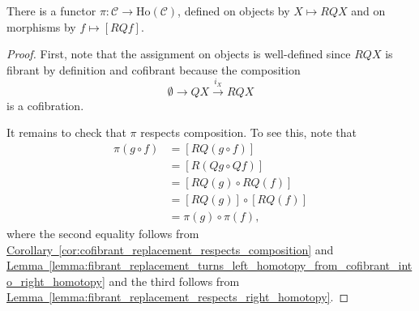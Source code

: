 \documentclass[main.tex]{subfiles}
\begin{document}
\begin{theorem}
  There is a functor $\pi\colon \mathcal{C} \to \mathrm{Ho}(\mathcal{C})$, defined on objects by $X \mapsto RQX$ and on morphisms by $f \mapsto [RQf]$.
\end{theorem}
\begin{proof}
  First, note that the assignment on objects is well-defined since $RQX$ is fibrant by definition and cofibrant because the composition
  \begin{equation*}
    \emptyset \to QX \overset{i_{X}}{\to} RQX
  \end{equation*}
  is a cofibration.

  It remains to check that $\pi$ respects composition. To see this, note that
  \begin{align*}
    \pi(g \circ f) &= [RQ(g \circ f)] \\
    &= [R(Qg \circ Qf)] \\
    &= [RQ(g) \circ RQ(f)] \\
    &= [RQ(g)] \circ [RQ(f)] \\
    &= \pi(g) \circ \pi(f),
  \end{align*}
  where the second equality follows from \hyperref[cor:cofibrant_replacement_respects_composition]{Corollary~\ref*{cor:cofibrant_replacement_respects_composition}} and \hyperref[lemma:fibrant_replacement_turns_left_homotopy_from_cofibrant_into_right_homotopy]{Lemma~\ref*{lemma:fibrant_replacement_turns_left_homotopy_from_cofibrant_into_right_homotopy}} and the third follows from \hyperref[lemma:fibrant_replacement_respects_right_homotopy]{Lemma~\ref*{lemma:fibrant_replacement_respects_right_homotopy}}.
\end{proof}
\end{document}
